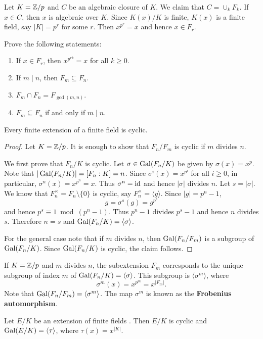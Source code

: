 Let $K=\mathbb{Z}/p$ and $C$ be an algebraic closure of $K$. 
We claim that $C=\cup_k F_k$. If $x\in C$, then $x$ is algebraic over $K$. 
Since $K(x)/K$ is finite, $K(x)$ is a finite field, say 
$|K|=p^r$ for some $r$. Then $x^{p^r}=x$ and hence $x\in F_r$. 

\begin{exercise}
    Prove the following statements:
    \begin{enumerate}
        \item If $x\in F_r$, then $x^{p^{rk}}=x$ for all $k\geq0$.
        \item If $m\mid n$, then $F_m\subseteq F_n$. 
        \item $F_m\cap F_n=F_{\gcd(m,n)}$.
        \item $F_m\subseteq F_n$ if and only if $m\mid n$. 
    \end{enumerate}
\end{exercise}

\begin{proposition}
    Every finite extension of a finite field is cyclic. 
\end{proposition}

\begin{proof}
    Let $K=\mathbb{Z}/p$. It is enough to show that $F_n/F_m$ is cyclic if $m$ divides $n$. 
    
    We first prove that $F_n/K$ is cyclic. Let $\sigma\in\operatorname{Gal}(F_n/K)$ be given by $\sigma(x)=x^p$. 
    Note that $|\operatorname{Gal}(F_n/K)|=[F_n:K]=n$. Since 
    $\sigma^i(x)=x^{p^i}$ for all $i\geq 0$, in particular, 
    $\sigma^n(x)=x^{p^n}=x$. Thus $\sigma^n=\operatorname{id}$ and hence $|\sigma|$ divides $n$. Let 
    $s=|\sigma|$. We know that $F_n^{\times}=F_n\setminus\{0\}$ is
    cyclic, say $F_n^{\times}=\langle g\rangle$. Since $|g|=p^n-1$, 
    \[
    g=\sigma^s(g)=g^{p^s}
    \]
    and hence $p^s\equiv 1\bmod (p^n-1)$. Thus $p^n-1$ divides $p^s-1$ and
    hence $n$ divides $s$. Therefore $n=s$ and $\operatorname{Gal}(F_n/K)=\langle\sigma\rangle$. 
    
    For the general case note that if $m$ divides $n$, 
    then $\operatorname{Gal}(F_n/F_m)$ is a subgroup of $\operatorname{Gal}(F_n/K)$. Since  $\operatorname{Gal}(F_n/K)$ is cyclic, 
    the claim follows.
\end{proof}

If $K=\mathbb{Z}/p$ and 
$m$ divides $n$, the subextension $F_m$ corresponds 
to the unique
subgroup of index $m$ of $\operatorname{Gal}(F_n/K)=\langle\sigma\rangle$. This subgroup
is $\langle\sigma^m\rangle$, where
\[
\sigma^m(x)=x^{p^m}=x^{|F_m|}.
\]
Note that $\operatorname{Gal}(F_n/F_m)=\langle\sigma^m\rangle$. 
The map $\sigma^m$ is known as 
the \textbf{Frobenius automorphism}. 

\begin{exercise}
    Let $E/K$ be an extension of finite fields . Then $E/K$ 
    is cyclic and $\operatorname{Gal}(E/K)=\langle\tau\rangle$, where $\tau(x)=x^{|K|}$. 
\end{exercise}


